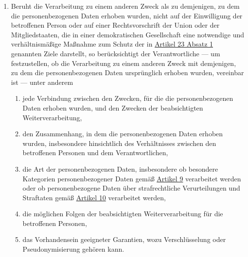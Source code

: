 \begin{enumerate}
  \item Beruht die Verarbeitung zu einem anderen Zweck als zu demjenigen, zu dem die personenbezogenen Daten erhoben
   wurden, nicht auf der Einwilligung der betroffenen Person oder auf einer Rechtsvorschrift der Union oder der
   Mitgliedstaaten, die in einer demokratischen Gesellschaft eine notwendige und verhältnismäßige Maßnahme zum Schutz
   der in \hyperref[itm:23-1]{Artikel 23 Absatz 1} genannten Ziele darstellt, so berücksichtigt der Verantwortliche —
   um festzustellen, ob die Verarbeitung zu einem anderen Zweck mit demjenigen, zu dem die personenbezogenen Daten
   ursprünglich erhoben wurden, vereinbar ist — unter anderem
  \label{itm:06-4}

  \begin{enumerate}
  
    \item jede Verbindung zwischen den Zwecken, für die die personenbezogenen Daten erhoben wurden, und den Zwecken der
     beabsichtigten Weiterverarbeitung,
    \label{itm:06-4a}

    \item den Zusammenhang, in dem die personenbezogenen Daten erhoben wurden, insbesondere hinsichtlich des
     Verhältnisses zwischen den betroffenen Personen und dem Verantwortlichen,
    \label{itm:06-4b}

    \item die Art der personenbezogenen Daten, insbesondere ob besondere Kategorien personenbezogener Daten gemäß
     \hyperref[ch:09]{Artikel 9} verarbeitet werden oder ob personenbezogene Daten über strafrechtliche Verurteilungen
      und Straftaten gemäß \hyperref[ch:10]{Artikel 10} verarbeitet werden,
    \label{itm:06-4c}

    \item die möglichen Folgen der beabsichtigten Weiterverarbeitung für die betroffenen Personen,
    \label{itm:06-4d}

    \item das Vorhandensein geeigneter Garantien, wozu Verschlüsselung oder Pseudonymisierung gehören kann.
    \label{itm:06-4e}

  \end{enumerate}

\end{enumerate}


